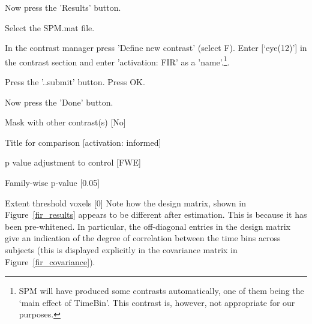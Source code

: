 \bi
\item{Now press the 'Results' button.}
\item{Select the SPM.mat file.}
\item{In the contrast manager press 'Define new contrast' (select F). Enter [`eye(12)'] in the contrast section and enter 'activation: FIR' as a 'name'.\footnote{SPM will have produced some contrasts automatically, one of them being the `main effect of TimeBin'. This contrast is, however, not 
appropriate for our purposes.}.}
\item{Press the '..submit' button. Press OK.}
\item{Now press the 'Done' button.}
\item{Mask with other contrast(s) [No]}
\item{Title for comparison [activation: informed]}
\item{p value adjustment to control [FWE]}
\item{Family-wise p-value [0.05]}
\item{Extent threshold {voxels} [0]}
\ei
Note how the design matrix, shown in Figure~\ref{fir_results} appears to be different after estimation. This is because it has been pre-whitened. In particular, the off-diagonal entries in the design matrix give an indication of the degree of correlation between the time bins across subjects (this is displayed explicitly in the covariance matrix in Figure~\ref{fir_covariance}).

